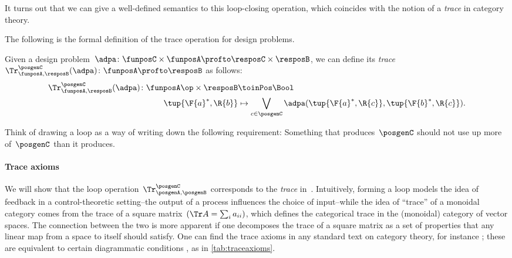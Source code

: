 It turns out that we can give a well-defined semantics to this loop-closing operation, which coincides with the notion of a \emph{trace} in category theory.

The following is the formal definition of the trace operation for design problems.

\begin{definition}
  \label{def:dp-trace}
  Given a design problem~$\adpa\colon \funposC \times \funposA \profto \resposC \times \resposB$, we can define
  its \emph{trace}~$\Tr_{\funposA,\resposB}^\posgenC(\adpa) \colon \funposA \profto \resposB$ as follows:
%
  \begin{equation}
    \label{eq:tracedef}
    \begin{aligned}
      \Tr_{\funposA,\resposB}^\posgenC(\adpa) \colon  \funposA\op \times \resposB &\toinPos \Bool \\
      \tup{\F{a}^*, \R{b}} &\mapsto \bigvee_{c\in \posgenC}
      \adpa(\tup{\F{a}^*, \R{c}},
      \tup{\F{b}^*, \R{c}}).
    \end{aligned}
  \end{equation}
\end{definition}


Think of drawing a loop as a way of writing down the following requirement: Something that produces~$\posgenC$ should not use up more of~$\posgenC$ than it produces.

\paragraph{Trace axioms}
We will show that the loop operation~$\Tr_{\posgenA,\posgenB}^\posgenC$ corresponds to the \emph{trace} in~\DP.
Intuitively, forming a loop models the idea of feedback in a control-theoretic setting--the output of a process influences the choice of input--while the idea of ``trace'' of a monoidal category comes from the trace of a square matrix~$(\Tr A = \sum_i a_{ii})$, which defines the categorical trace in the (monoidal) category of vector spaces.
The connection between the two is more apparent if one decomposes the trace of a square matrix as a set of properties that any linear map from a space to itself should satisfy. One can find the trace axioms in any standard text on category theory, for instance  \cite{mac2013categories};
these are equivalent to certain diagrammatic conditions \cite{joyal96}, as in \cref{tab:traceaxioms}.


